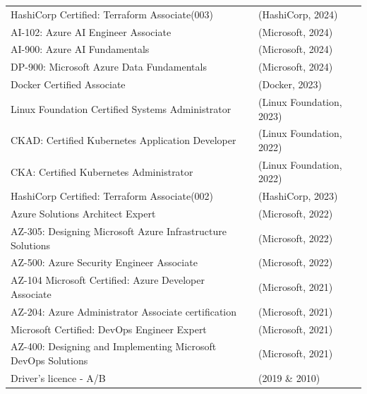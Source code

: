 \documentclass[a4paper,8pt]{article}
\begin{document}
\begin{tabular}{l l}
HashiCorp Certified: Terraform Associate(003) & (HashiCorp, 2024) \\
AI-102: Azure AI Engineer Associate & (Microsoft, 2024) \\
AI-900: Azure AI Fundamentals & (Microsoft, 2024) \\
DP-900: Microsoft Azure Data Fundamentals  &(Microsoft, 2024) \\
Docker Certified Associate & (Docker, 2023) \\
Linux Foundation Certified Systems Administrator & (Linux Foundation, 2023) \\
CKAD: Certified Kubernetes Application Developer & (Linux Foundation, 2022) \\
CKA: Certified Kubernetes Administrator & (Linux Foundation, 2022) \\
HashiCorp Certified: Terraform Associate(002) &(HashiCorp, 2023) \\
Azure Solutions Architect Expert & (Microsoft, 2022) \\
AZ-305: Designing Microsoft Azure Infrastructure Solutions & (Microsoft, 2022) \\
AZ-500: Azure Security Engineer Associate & (Microsoft, 2022) \\
AZ-104 Microsoft Certified: Azure Developer Associate & (Microsoft, 2021) \\
AZ-204: Azure Administrator Associate certification & (Microsoft, 2021) \\
Microsoft Certified: DevOps Engineer Expert & (Microsoft, 2021) \\
AZ-400: Designing and Implementing Microsoft DevOps Solutions & (Microsoft, 2021) \\
    Driver's licence - A/B & (2019 \& 2010)
\end{tabular}

\end{document}
